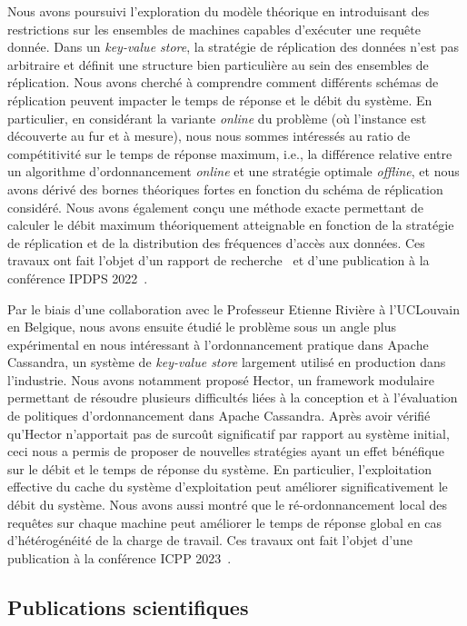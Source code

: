 \documentclass[12pt]{article}
\begin{document}
Nous avons poursuivi l'exploration du modèle théorique en introduisant des restrictions sur les
ensembles de machines capables d'exécuter une requête donnée.  
Dans un \emph{key-value store}, la stratégie de réplication des données n'est pas arbitraire et
définit une structure bien particulière au sein des ensembles de réplication.  
Nous avons cherché à comprendre comment différents schémas de réplication peuvent impacter le temps
de réponse et le débit du système.  
En particulier, en considérant la variante \emph{online} du problème (où l'instance est découverte
au fur et à mesure), nous nous sommes intéressés au ratio de compétitivité sur le temps de réponse
maximum, i.e., la différence relative entre un algorithme d'ordonnancement \emph{online} et une
stratégie optimale \emph{offline}, et nous avons dérivé des bornes théoriques fortes en fonction du
schéma de réplication considéré.  
Nous avons également conçu une méthode exacte permettant de calculer le débit maximum théoriquement
atteignable en fonction de la stratégie de réplication et de la distribution des fréquences d'accès
aux données.  
Ces travaux ont fait l'objet d'un rapport de recherche~\cite{canon2022-rr} et d'une publication à la
conférence IPDPS 2022~\cite{canon2022}.

Par le biais d'une collaboration avec le Professeur Etienne Rivière à l'UCLouvain en Belgique, nous
avons ensuite étudié le problème sous un angle plus expérimental en nous intéressant à
l'ordonnancement pratique dans Apache Cassandra, un système de \emph{key-value store} largement
utilisé en production dans l'industrie.  
Nous avons notamment proposé Hector, un framework modulaire permettant de résoudre plusieurs
difficultés liées à la conception et à l'évaluation de politiques d'ordonnancement dans Apache
Cassandra.  
Après avoir vérifié qu'Hector n'apportait pas de surcoût significatif par rapport au système
initial, ceci nous a permis de proposer de nouvelles stratégies ayant un effet bénéfique sur le
débit et le temps de réponse du système.  
En particulier, l'exploitation effective du cache du système d'exploitation peut améliorer
significativement le débit du système.  
Nous avons aussi montré que le ré-ordonnancement local des requêtes sur chaque machine peut
améliorer le temps de réponse global en cas d'hétérogénéité de la charge de travail.  
Ces travaux ont fait l'objet d'une publication à la conférence ICPP 2023~\cite{canon2023b}.

\subsection{Publications scientifiques}
\end{document}
